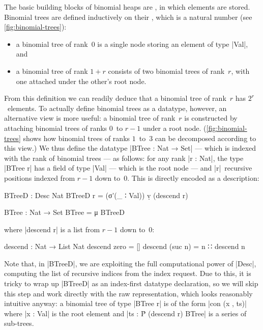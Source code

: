 The basic building blocks of binomial heaps are , in which elements are stored.
Binomial trees are defined inductively on their , which is a natural number (see \autoref{fig:binomial-trees}):
\begin{itemize}
\item a binomial tree of rank~$0$ is a single node storing an element of type |Val|, and
\item a binomial tree of rank $1+r$ consists of two binomial trees of rank~$r$, with one attached under the other's root node.
\end{itemize}
From this definition we can readily deduce that a binomial tree of rank~$r$ has $2^r$~elements.
To actually define binomial trees as a datatype, however, an alternative view is more useful: a binomial tree of rank~$r$ is constructed by attaching binomial trees of ranks $0$~to $r-1$ under a root node.
(\autoref{fig:binomial-trees} shows how binomial trees of ranks $1$~to~$3$ can be decomposed according to this view.)
We thus define the datatype |BTree : Nat → Set| --- which is indexed with the rank of binomial trees --- as follows: for any rank |r : Nat|, the type |BTree r| has a field of type |Val| --- which is the root node --- and |r|~recursive positions indexed from $r-1$ down to~$0$.
This is directly encoded as a description:
\begin{code}
BTreeD : Desc Nat
BTreeD r = (σ'(_ ∶ Val)) ṿ (descend r)

BTree : Nat → Set
BTree = μ BTreeD
\end{code}
where |descend r| is a list from $r-1$ down to~$0$:
\begin{code}
descend : Nat → List Nat
descend zero     =  []
descend (suc n)  =  n ∷ descend n
\end{code}
Note that, in |BTreeD|, we are exploiting the full computational power of |Desc|, computing the list of recursive indices from the index request.
Due to this, it is tricky to wrap up |BTreeD| as an index-first datatype declaration, so we will skip this step and work directly with the raw representation, which looks reasonably intuitive anyway: a binomial tree of type |BTree r| is of the form |con (x , ts)| where |x : Val| is the root element and |ts : Ṗ (descend r) BTree| is a series of sub-trees.

